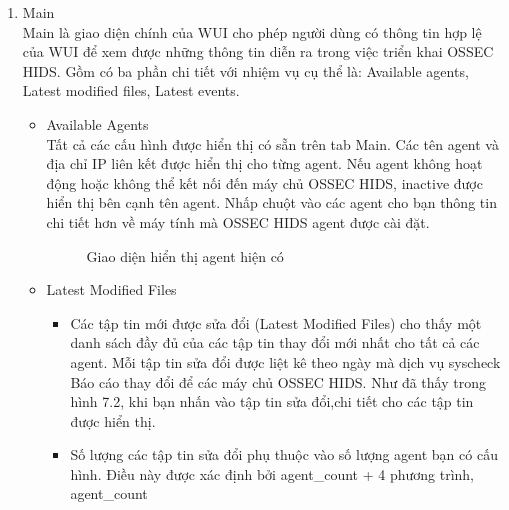  \begin{enumerate}
    \item Main\\
    Main là giao diện chính của WUI cho phép người dùng có thông tin hợp lệ của
    WUI để xem được những thông tin diễn ra trong việc triển khai OSSEC HIDS.
    Gồm có ba phần chi tiết với nhiệm vụ cụ thể là: Available agents, Latest
    modified files, Latest events.
    \begin{itemize}
      \item Available Agents\\
      Tất cả các cấu hình được hiển thị có sẵn trên tab Main. Các tên agent và địa chỉ IP liên kết được hiển thị cho từng agent. Nếu agent không hoạt động hoặc không thể kết nối đến máy chủ OSSEC HIDS, inactive được hiển thị bên cạnh tên agent.
Nhấp chuột vào các agent cho bạn thông tin chi tiết hơn về máy tính mà
OSSEC HIDS agent được cài đặt.
	  \begin{figure}[h!]
	\centering 
	\caption{Giao diện hiển thị agent hiện có}
  \end{figure}
  \item Latest Modified Files
  \begin{itemize}
    \item Các tập tin mới được sửa đổi (Latest Modified Files) cho thấy một
    danh sách đầy đủ của các tập tin thay đổi mới nhất cho tất cả các agent. Mỗi tập tin sửa đổi được liệt kê theo ngày mà dịch vụ syscheck Báo cáo thay đổi để các máy chủ OSSEC HIDS. Như đã thấy trong hình 7.2, khi bạn nhấn vào tập tin sửa đổi,chi tiết cho các tập tin được hiển thị.
    \item Số lượng các tập tin sửa đổi phụ thuộc vào số lượng agent bạn có cấu
    hình. Điều này được xác định bởi agent\_count + 4 phương trình, agent\_count

\end{itemize}
\end{itemize}
\end{enumerate}
